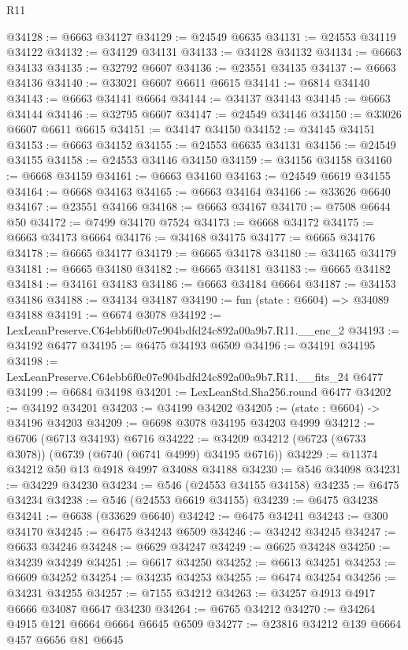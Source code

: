 \begin{lexlean}{R11}
\begin{coremodule}
@34128 := @6663 @34127
@34129 := @24549 @6635
@34131 := @24553 @34119 @34122
@34132 := @34129 @34131
@34133 := @34128 @34132
@34134 := @6663 @34133
@34135 := @32792 @6607
@34136 := @23551 @34135
@34137 := @6663 @34136
@34140 := @33021 @6607 @6611 @6615
@34141 := @6814 @34140
@34143 := @6663 @34141 @6664
@34144 := @34137 @34143
@34145 := @6663 @34144
@34146 := @32795 @6607
@34147 := @24549 @34146
@34150 := @33026 @6607 @6611 @6615
@34151 := @34147 @34150
@34152 := @34145 @34151
@34153 := @6663 @34152
@34155 := @24553 @6635 @34131
@34156 := @24549 @34155
@34158 := @24553 @34146 @34150
@34159 := @34156 @34158
@34160 := @6668 @34159
@34161 := @6663 @34160
@34163 := @24549 @6619 @34155
@34164 := @6668 @34163
@34165 := @6663 @34164
@34166 := @33626 @6640
@34167 := @23551 @34166
@34168 := @6663 @34167
@34170 := @7508 @6644 @50
@34172 := @7499 @34170 @7524
@34173 := @6668 @34172
@34175 := @6663 @34173 @6664
@34176 := @34168 @34175
@34177 := @6665 @34176
@34178 := @6665 @34177
@34179 := @6665 @34178
@34180 := @34165 @34179
@34181 := @6665 @34180
@34182 := @6665 @34181
@34183 := @6665 @34182
@34184 := @34161 @34183
@34186 := @6663 @34184 @6664
@34187 := @34153 @34186
@34188 := @34134 @34187
@34190 := fun (state : @6604) => @34089 @34188
@34191 := @6674 @3078
@34192 := LexLeanPreserve.C64ebb6f0c07e904bdfd24c892a00a9b7.R11.__enc_2
@34193 := @34192 @6477
@34195 := @6475 @34193 @6509
@34196 := @34191 @34195
@34198 := LexLeanPreserve.C64ebb6f0c07e904bdfd24c892a00a9b7.R11.__fits_24 @6477
@34199 := @6684 @34198
@34201 := LexLeanStd.Sha256.round @6477
@34202 := @34192 @34201
@34203 := @34199 @34202
@34205 := (state : @6604) -> @34196 @34203
@34209 := @6698 @3078 @34195 @34203 @4999
@34212 := @6706 (@6713 @34193) @6716
@34222 := @34209 @34212 (@6723 (@6733 @3078)) (@6739 (@6740 (@6741 @4999) @34195 @6716))
@34229 := @11374 @34212 @50 @13 @4918 @4997 @34088 @34188
@34230 := @546 @34098
@34231 := @34229 @34230
@34234 := @546 (@24553 @34155 @34158)
@34235 := @6475 @34234
@34238 := @546 (@24553 @6619 @34155)
@34239 := @6475 @34238
@34241 := @6638 (@33629 @6640)
@34242 := @6475 @34241
@34243 := @300 @34170
@34245 := @6475 @34243 @6509
@34246 := @34242 @34245
@34247 := @6633 @34246
@34248 := @6629 @34247
@34249 := @6625 @34248
@34250 := @34239 @34249
@34251 := @6617 @34250
@34252 := @6613 @34251
@34253 := @6609 @34252
@34254 := @34235 @34253
@34255 := @6474 @34254
@34256 := @34231 @34255
@34257 := @7155 @34212
@34263 := @34257 @4913 @4917 @6666 @34087 @6647 @34230
@34264 := @6765 @34212
@34270 := @34264 @4915 @121 @6664 @6664 @6645 @6509
@34277 := @23816 @34212 @139 @6664 @457 @6656 @81 @6645

\end{coremodule}
\end{lexlean}
